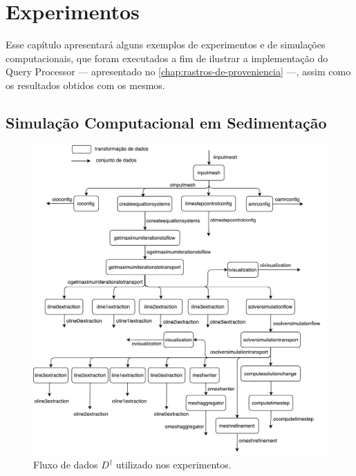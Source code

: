 
\chapter{Experimentos}%
\label{chap:experimentos}

Esse capítulo apresentará alguns exemplos de experimentos e de simulações computacionais, que foram executados a fim de ilustrar a implementação do Query Processor --- apresentado no \autoref{chap:rastros-de-proveniencia} ---, assim como os resultados obtidos com os mesmos.

\section{Simulação Computacional em Sedimentação}



\begin{figure}[!htb]
    \centering
    \includegraphics[width=\textwidth]{img/experiments-dataflow}
    \caption[Fluxo de dados $D^{\dagger}$ utilizado nos experimentos]{Fluxo de dados $D^{\dagger}$ utilizado nos experimentos.}%
    \label{fig:experiments-dataflow}
\end{figure}


